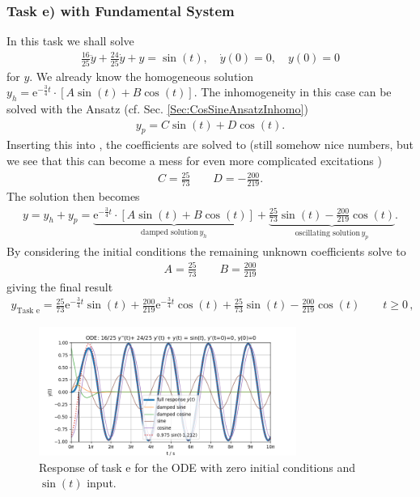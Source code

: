 \subsubsection{Task e) with Fundamental System}
\label{sec:TaskeWithFundamentalSystem}
In this task we shall solve
\begin{align}
\label{eq:InHomoODE_sin}
\frac{16}{25} \ddot{y} + \frac{24}{25} \dot{y} + y = \sin(t), \quad
\dot{y}(0) = 0,\quad y(0)=0
\end{align}
for $y$.
%
We already know the homogeneous solution
$y_h = \mathrm{e}^{-\frac{3}{4} t} \cdot
\left[ A \sin(t) + B \cos(t)\right]$.
%
The inhomogeneity in this case can be solved with the Ansatz (cf.
Sec. \ref{Sec:CosSineAnsatzInhomo})
\begin{align}
y_p = C \sin(t) + D \cos(t).
\end{align}
Inserting this into , the
coefficients are solved to (still somehow nice numbers, but we see that this can
become a mess for even more complicated excitations
)
\begin{align}
C = \frac{25}{73}\qquad D = -\frac{200}{219}.
\end{align}
%
The solution then becomes
\begin{align}
y = y_h + y_p = \underbrace{\mathrm{e}^{-\frac{3}{4} t} \cdot
\left[ A \sin(t) + B \cos(t)\right]}_{\text{damped solution} \, y_h}+
\underbrace{\frac{25}{73} \sin(t) - \frac{200}{219} \cos(t)}_{\text{oscillating solution} \, y_p}.
\end{align}
By considering the initial conditions the remaining unknown coefficients solve to
\begin{align}
A = \frac{25}{73}\qquad B = \frac{200}{219}
\end{align}
giving the final result
\begin{align}
\boxed{
y_\text{Task e} = \frac{25}{73} \mathrm{e}^{-\frac{3}{4} t} \sin(t) +
\frac{200}{219} \mathrm{e}^{-\frac{3}{4} t} \cos(t) +
\frac{25}{73} \sin(t) -
\frac{200}{219} \cos(t) \qquad t\geq 0
}\, ,
\end{align}
%
\begin{figure}[h!]
\centering
\includegraphics[width=0.75\textwidth]{../laplace_transform/sine_excitation_response}
\caption{Response of task e for the ODE with zero initial conditions and
$\sin(t)$ input.}
\label{fig:sine_excitation_response}
\end{figure}

